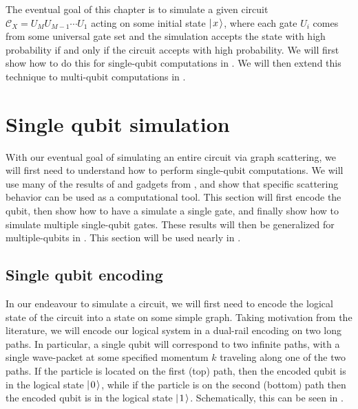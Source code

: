 \documentclass[../thesis-main/thesis-main]{subfiles}
\begin{document}
The eventual goal of this chapter is to simulate a given circuit $\mathcal{C}_X = U_{M} U_{M-1}\cdots U_1$ acting on some initial state $|\mspace{2mu} x \mspace{2mu} \rangle$, where each gate $U_i$ comes from some universal gate set and the simulation accepts the state with high probability if and only if the circuit accepts with high probability.  We will first show how to do this for single-qubit computations in .  We will then extend this technique to multi-qubit computations in .






\section{Single qubit simulation}\label{sec:SP_single_qubit_computations}

With our eventual goal of simulating an entire circuit via graph scattering, we will first need to understand how to perform single-qubit computations.  We will use many of the results of  and gadgets from , and show that specific scattering behavior can be used as a computational tool.  This section will first encode the qubit, then show how to have a simulate a single gate, and finally show how to simulate multiple single-qubit gates.   These results will then be generalized for multiple-qubits in .  This section will be used nearly in .


\subsection{Single qubit encoding}\label{sec:single_qubit_encoding}

In our endeavour to simulate a circuit, we will first need to encode the logical state of the circuit into a state on some simple graph.  Taking motivation from the literature, we will encode our logical system in a dual-rail encoding on two long paths.  In particular, a single qubit will correspond to two infinite paths, with a single wave-packet at some specified momentum $k$ traveling along one of the two paths.  If the particle is located on the first (top) path, then the encoded qubit is in the logical state $|\mspace{2mu} 0 \mspace{2mu} \rangle$, while if the particle is on the second (bottom) path then the encoded qubit is in the logical state $|\mspace{2mu} 1 \mspace{2mu} \rangle$.  Schematically, this can be seen in .
\end{document}
